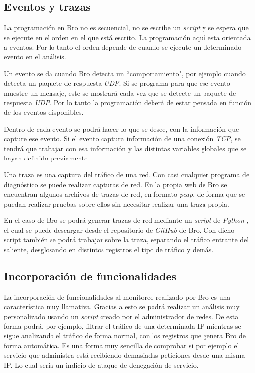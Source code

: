 \subsection{Eventos y trazas}

La programación en Bro no es secuencial, no se escribe un \textit{script} y se espera que se ejecute en el orden 
en el que está escrito. La programación aquí esta orientada a eventos. Por lo tanto el orden depende de cuando 
se ejecute un determinado evento en el análisis.

\intro Un evento se da cuando Bro detecta un ``comportamiento", por ejemplo cuando detecta un paquete 
de respuesta \textit{UDP}. Si se programa para que ese evento muestre un mensaje, este se mostrará cada vez que se detecte un paquete de respuesta \textit{UDP}. Por lo tanto la programación deberá de estar pensada en función de los eventos disponibles.

\intro Dentro de cada evento se podrá hacer lo que se desee, con la información que capture ese evento. Si 
el evento captura información de una conexión \textit{TCP}, se tendrá que trabajar con esa información y las 
distintas variables globales que se hayan definido previamente.

\intro Una traza es una captura del tráfico de una red. Con casi cualquier programa de diagnóstico se puede 
realizar capturas de red. En la propia web de Bro se encuentran algunos archivos de trazas de red, en 
formato \textit{pcap}, de forma que se puedan realizar pruebas sobre ellos sin necesitar realizar una 
traza propia.

\intro En el caso de Bro se podrá generar trazas de red mediante un \textit{script} de \textit{Python}
\cite{brotrace}, el cual se puede descargar desde el repositorio de \textit{GitHub} de Bro. Con dicho script también 
se podrá trabajar sobre la traza, separando el tráfico entrante del saliente, desglosando en distintos registros 
el tipo de tráfico y demás.


\subsection{Incorporación de funcionalidades}

La incorporación de funcionalidades al monitoreo realizado por Bro es una característica muy llamativa. Gracias 
a esto se podrá realizar un análisis muy personalizado usando un \textit{script} creado por el administrador de redes. De 
esta forma podrá, por ejemplo, filtrar el tráfico de una determinada IP mientras se sigue analizando el tráfico 
de forma normal, con los registros que genera Bro de forma automática. Es una forma muy sencilla de comprobar 
si por ejemplo el servicio que administra está recibiendo demasiadas peticiones desde una misma IP. Lo cual 
sería un indicio de ataque de denegación de servicio.

